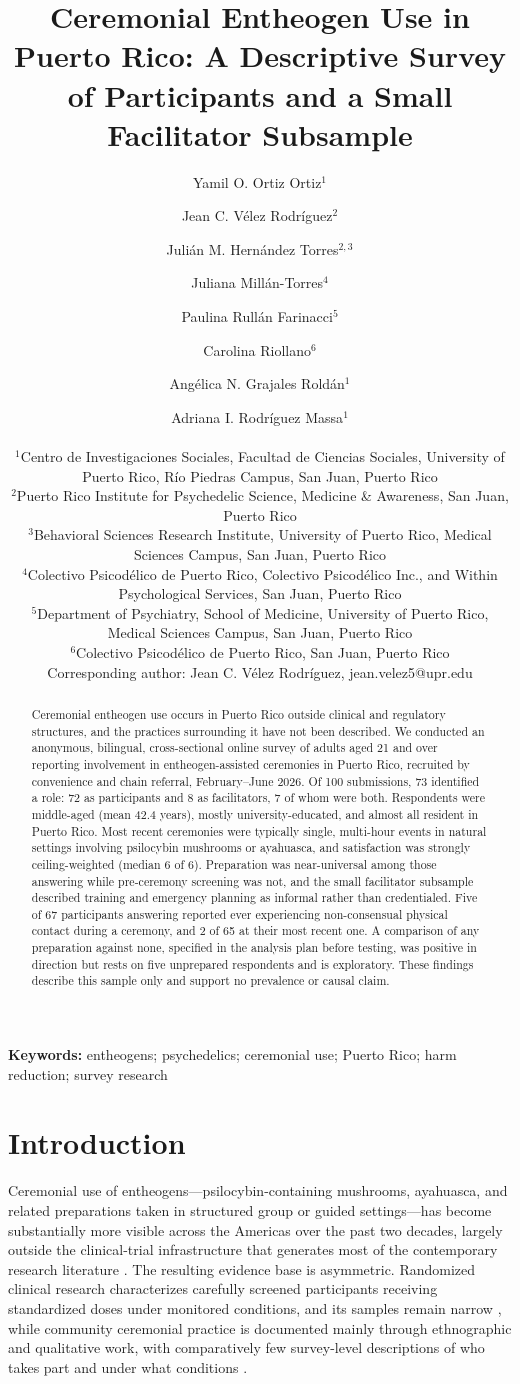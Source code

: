 \documentclass[12pt]{article}
\title{Ceremonial Entheogen Use in Puerto Rico: A Descriptive Survey of Participants
and a Small Facilitator Subsample}
\author{
  Yamil O. Ortiz Ortiz$^{1}$ \and Jean C. V\'elez Rodr\'iguez$^{2}$ \and Juli\'an M. Hern\'andez Torres$^{2,3}$ \and
  Juliana Mill\'an-Torres$^{4}$ \and Paulina Rull\'an Farinacci$^{5}$ \and Carolina Riollano$^{6}$ \and
  Ang\'elica N. Grajales Rold\'an$^{1}$ \and Adriana I. Rodr\'iguez Massa$^{1}$ \\[1em]
  \begin{minipage}{0.92\textwidth}\centering\small\setstretch{1.15}
  $^{1}$Centro de Investigaciones Sociales, Facultad de Ciencias Sociales, University of Puerto Rico,
  R\'io Piedras Campus, San Juan, Puerto Rico \\
  $^{2}$Puerto Rico Institute for Psychedelic Science, Medicine \& Awareness, San Juan, Puerto Rico \\
  $^{3}$Behavioral Sciences Research Institute, University of Puerto Rico, Medical Sciences Campus,
  San Juan, Puerto Rico \\
  $^{4}$Colectivo Psicod\'elico de Puerto Rico, Colectivo Psicod\'elico Inc., and Within Psychological
  Services, San Juan, Puerto Rico \\
  $^{5}$Department of Psychiatry, School of Medicine, University of Puerto Rico, Medical Sciences Campus,
  San Juan, Puerto Rico \\
  $^{6}$Colectivo Psicod\'elico de Puerto Rico, San Juan, Puerto Rico \\[0.5em]
  Corresponding author: Jean C. V\'elez Rodr\'iguez, jean.velez5@upr.edu
  \end{minipage}
}
\date{}
\begin{document}
\maketitle
\linenumbers

\begin{abstract}
\noindent
Ceremonial entheogen use occurs in Puerto Rico outside clinical and regulatory structures, and the
practices surrounding it have not been described. We conducted an anonymous, bilingual, cross-sectional
online survey of adults aged 21 and over reporting involvement in entheogen-assisted ceremonies in Puerto
Rico, recruited by convenience and chain referral, February--June 2026. Of 100 submissions, 73
identified a role: 72 as participants and 8 as facilitators, 7 of whom were both. Respondents were
middle-aged (mean 42.4 years), mostly university-educated, and almost all resident in Puerto Rico. Most
recent ceremonies were typically single, multi-hour events in natural settings involving psilocybin
mushrooms or ayahuasca, and satisfaction was strongly ceiling-weighted (median 6 of 6). Preparation was
near-universal among those answering while pre-ceremony screening was not, and the small facilitator
subsample described training and emergency planning as informal rather than credentialed. Five of 67
participants answering reported ever experiencing non-consensual physical contact during a ceremony, and 2
of 65 at their most recent one. A comparison of any preparation against none, specified in the analysis
plan before testing, was positive in direction but rests on five unprepared respondents and is exploratory.
These findings describe this sample only and support no prevalence or causal claim.
\end{abstract}

\noindent\textbf{Keywords:} entheogens; psychedelics; ceremonial use; Puerto Rico; harm reduction; survey research

\section{Introduction}

Ceremonial use of entheogens---psilocybin-containing mushrooms, ayahuasca, and related preparations taken
in structured group or guided settings---has become substantially more visible across the Americas over the
past two decades, largely outside the clinical-trial infrastructure that generates most of the contemporary
research literature \citep{golden2022effects,carvalho2025scoping}. The resulting evidence base is
asymmetric. Randomized clinical research characterizes carefully screened participants receiving
standardized doses under monitored conditions, and its samples remain narrow
\citep{hughes2024ethnoracial,marcus2026psychedelics}, while community ceremonial practice is documented
mainly through ethnographic and qualitative work, with comparatively few survey-level descriptions of who
takes part and under what conditions \citep{carvalho2025scoping,teixeira2026ayahuasca}.
\end{document}
